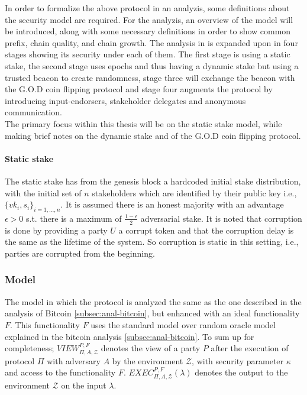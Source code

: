In order to formalize the above protocol in an analyzis, some definitions about the security model are required. For the analyzis, an overview of the model will be introduced, along with some necessary definitions in order to show common prefix, chain quality, and chain growth. The analysis in \cite{ouroboros} is expanded upon in four stages showing its security under each of them. The first stage is using a static stake, the second stage uses epochs and thus having a dynamic stake but using a trusted beacon to create randomness, stage three will exchange the beacon with the G.O.D coin flipping protocol and stage four augments the protocol by introducing input-endorsers, stakeholder delegates and anonymous communication.\\

The primary focus within this thesis will be on the static stake model, while making brief notes on the dynamic stake and of the G.O.D coin flipping protocol.

\paragraph{Static stake} The static stake has from the genesis block a hardcoded initial stake distribution, with the initial set of $n$ stakeholders which are identified by their public key i.e., $\{vk_i, s_i\}_{i=1,...,n}$. It is assumed there is an honest majority with an advantage $\epsilon > 0$ s.t. there is a maximum of $\frac{1-\epsilon}{2}$ adversarial stake. It is noted that corruption is done by providing a party $U$ a corrupt token and that the corruption delay is the same as the lifetime of the system. So corruption is static in this setting, i.e., parties are corrupted from the beginning.

\subsubsection*{Model}

The model in which the protocol is analyzed the same as the one described in the analysis of Bitcoin \ref{subsec:anal-bitcoin}, but enhanced with an ideal functionality $F$. This functionality $F$ uses the standard model over random oracle model explained in the bitcoin analysis \ref{subsec:anal-bitcoin}. To sum up for completeness; $VIEW_{\Pi, A, \mathcal{Z}}^{P,F}$ denotes the view of a party $P$ after the execution of protocol $\Pi$ with adversary $A$ by the environment $\mathcal{Z}$, with security parameter $\kappa$ and access to the functionality $F$. $EXEC_{\Pi, A, \mathcal{Z}}^{P,F}(\lambda)$ denotes the output to the environment $\mathcal{Z}$ on the input $\lambda$.\\


